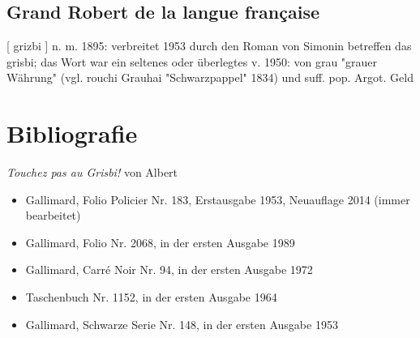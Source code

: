 \subsection*{Grand Robert de la langue française}
[ grizbi ] n. m. 1895: verbreitet 1953 durch den Roman von Simonin betreffen das grisbi; das Wort war ein seltenes oder überlegtes v. 1950: von grau "grauer Währung" (vgl. rouchi Grauhai "Schwarzpappel" 1834) und suff. pop. Argot. Geld


\section{Bibliografie\label{preamble-biblio}}

\emph{Touchez pas au Grisbi!} von Albert 

\begin{itemize}
\item Gallimard, Folio Policier Nr. 183, Erstausgabe 1953, Neuauflage 2014 (immer bearbeitet)
\item Gallimard, Folio Nr. 2068, in der ersten Ausgabe 1989
\item Gallimard, Carré Noir Nr. 94, in der ersten Ausgabe 1972
\item Taschenbuch Nr. 1152, in der ersten Ausgabe 1964
\item Gallimard, Schwarze Serie Nr. 148, in der ersten Ausgabe 1953
\end{itemize}





